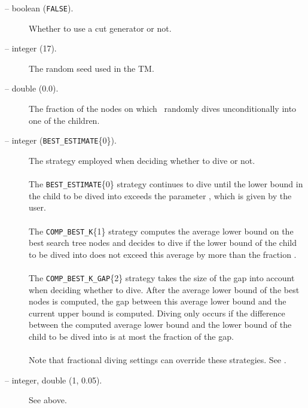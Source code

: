 \begin{description}
\item[ -- boolean ({\tt FALSE}).]
Whether to use a cut generator or not. 

\item[ -- integer (17).] 
The random seed used in the TM.

\item[ -- double (0.0).] 
The fraction of the nodes on which \BB\ randomly dives
unconditionally into one of the children.

\label{diving_strategy}
\item[ -- integer ({\tt BEST\_ESTIMATE}\{0\}).] 
The strategy employed when deciding whether to dive or not. \\
\\
The {\tt BEST\_ESTIMATE}\{0\} strategy continues to dive until the
lower bound in the child to be dived into exceeds the parameter
, which is 
given by the user. \\
\\
The {\tt COMP\_BEST\_K}\{1\} strategy computes the average lower bound
on the best  search tree nodes and
decides to dive if
the lower bound of the child to be dived into does not exceed this
average by more than the fraction .
\\
\\
The {\tt COMP\_BEST\_K\_GAP}\{2\} strategy takes the size of the gap
into account when deciding whether to dive. After the average lower
bound of the best  nodes is computed, 
the gap between
this average lower bound and the current upper bound is computed.
Diving only occurs if the difference between the computed average
lower bound and the lower bound of the child to be dived into is at
most the fraction  of the gap.\\
\\
Note that fractional diving settings can override these strategies.
See .

\label{diving}
\item[ -- integer, double (1, 0.05).] 
See above.


\end{description}

